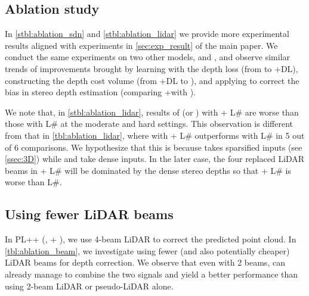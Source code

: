 \subsection{Ablation study}
\label{ssec:AS}

In \autoref{stbl:ablation_sdn} and \autoref{stbl:ablation_lidar} we provide more experimental results aligned with experiments in \autoref{sec:exp_result} of the main paper. We conduct the same experiments on two other models, \AVOD and \vPIXOR, and observe similar trends of improvements brought by learning with the depth loss (from \PSMNet to \PSMNet+DL), constructing the depth cost volume (from \PSMNet+DL to \SDN), and applying \GDC to correct the bias in stereo depth estimation (comparing \SDN+\GDC with \SDN).

We note that, in \autoref{stbl:ablation_lidar}, results of \AVOD (or \vPIXOR) with \SDN + L\# are worse than those with L\# at the moderate and hard settings. This observation is different from that in \autoref{tbl:ablation_lidar}, where \PRCNN with \SDN + L\# outperforms \PRCNN with L\# in 5 out of 6 comparisons. We hypothesize that this is because \PRCNN takes sparsified inputs (see \autoref{ssec:3D}) while \AVOD and \vPIXOR take dense inputs. In the later case, the four replaced LiDAR beams in \SDN+ L\# will be dominated by the dense stereo depths so that \SDN+ L\# is worse than L\#.

\subsection{Using fewer LiDAR beams}
\label{ssec:FewerLiDAR}
In PL++ (\ie, \SDN+ \GDC), we use 4-beam LiDAR to correct the predicted point cloud. In \autoref{tbl:ablation_beam}, we investigate using fewer (and also potentially cheaper) LiDAR beams for depth correction. We observe that even with 2 beams, \GDC can already manage to combine the two signals and yield a better performance than using 2-beam LiDAR or pseudo-LiDAR alone.

